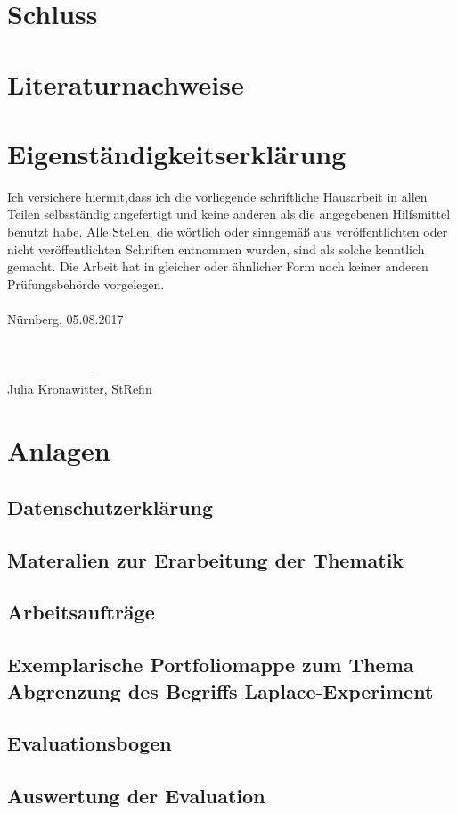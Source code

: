 \documentclass[a4paper,12pt,twoside=false]{scrartcl}
\begin{document}
\section{Schluss}
\newpage
\section{Literaturnachweise}
\nocite{lp17}\nocite{jim16}\nocite{daten}


\newpage
\section{Eigenständigkeitserklärung}
Ich versichere hiermit,dass ich die vorliegende schriftliche Hausarbeit in allen Teilen selbsständig angefertigt und keine anderen als die angegebenen Hilfsmittel benutzt habe. Alle Stellen, die wörtlich oder sinngemäß aus veröffentlichten oder nicht veröffentlichten Schriften entnommen wurden, sind als solche kenntlich gemacht. Die Arbeit hat in gleicher oder ähnlicher Form noch keiner anderen Prüfungsbehörde vorgelegen. \\\\
Nürnberg, 05.08.2017\\\\
\vspace{0.6cm}\\
$\underline{~~~~~~~~~~~~~~~~~~~~~~~~~~~~~~~~~~~~~~~~~~~~~~~~~~~~~~~~~~~~~~}$\\
\small{Julia Kronawitter, StRefin}
\section{Anlagen}
\subsection{Datenschutzerklärung}

\subsection{Materalien zur Erarbeitung der Thematik}
\subsection{Arbeitsaufträge}
\subsection{Exemplarische Portfoliomappe zum Thema \glqq Abgrenzung des Begriffs Laplace-Experiment}
\subsection{Evaluationsbogen}
\subsection{Auswertung der Evaluation}
\end{document}
